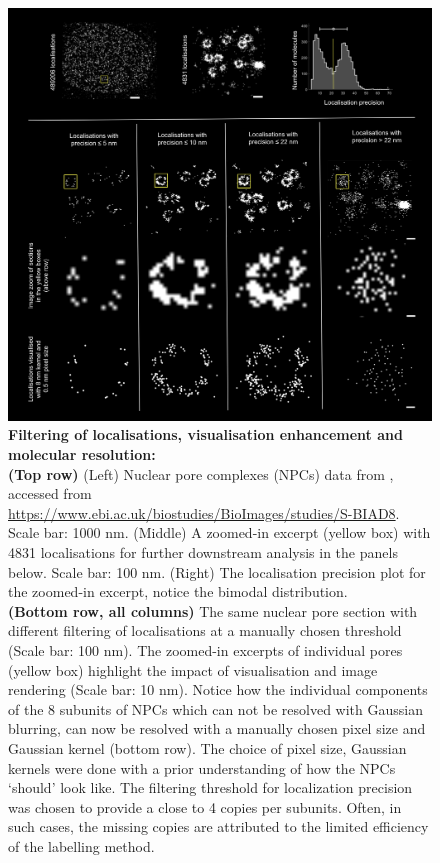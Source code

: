 \documentclass[9pt,twocolumn,twoside]{pnas-new}
\begin{document}
 \begin{figure}[!ht]
\begin{center}
\includegraphics[width=17cm]{Figures/Filtering}
\end{center}
\caption[]{\textbf{Filtering of localisations, visualisation enhancement and molecular resolution:}  \\
\textbf{(Top row)} (Left) Nuclear pore complexes (NPCs) data from \cite{thevathasan2019nuclear}, accessed from \url{https://www.ebi.ac.uk/biostudies/BioImages/studies/S-BIAD8}.  Scale bar: 1000 nm. (Middle) A zoomed-in excerpt (yellow box) with 4831 localisations for further downstream analysis in the panels below. Scale bar: 100 nm. (Right) The localisation precision plot for the zoomed-in excerpt, notice the bimodal distribution. \\
\textbf{(Bottom row, all columns)} The same nuclear pore section with different filtering of localisations at a manually chosen threshold (Scale bar: 100 nm). The zoomed-in excerpts of individual pores (yellow box) highlight the impact of visualisation and image rendering (Scale bar: 10 nm). Notice how the individual components of the 8 subunits of NPCs which can not be resolved with Gaussian blurring, can now be resolved with a manually chosen pixel size and Gaussian kernel (bottom row). The choice of pixel size, Gaussian kernels were done with a prior understanding of how the NPCs `should' look like. The filtering threshold for localization precision was chosen to provide a close to 4 copies per subunits. Often, in such cases, the missing copies are attributed to the limited efficiency of the labelling method.  
 }
  \label{fig:npcs4}
\end{figure}
\end{document}
